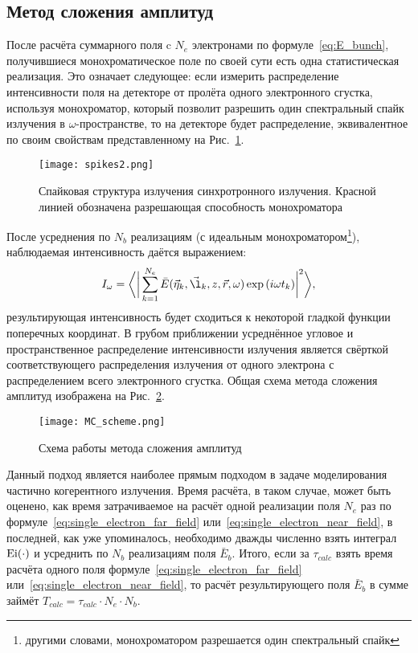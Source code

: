\subsection{Метод сложения амплитуд}
После расчёта суммарного поля c $N_e$ электронами по формуле~\ref{eq:E_bunch}, получившиеся монохроматическое поле по своей сути есть одна статистическая реализация. Это означает следующее: если измерить распределение интенсивности поля на детекторе от пролёта одного электронного сгустка, используя монохроматор, который позволит разрешить один спектральный спайк излучения в $\omega$-пространстве, то на детекторе будет распределение, эквивалентное по своим свойствам представленному на Рис.~\ref{fig:spikes2}. 
\begin{figure}[H]
	\centering 	\texttt{[image: spikes2.png]}
	\caption{Спайковая структура излучения синхротронного излучения. Красной линией обозначена разрешающая способность монохроматора}
	\label{fig:spikes2}
\end{figure}
\noindent После усреднения по $N_b$ реализациям (с идеальным монохроматором\footnote{другими словами, монохроматором разрешается один спектральный спайк}), наблюдаемая интенсивность даётся выражением: 
\begin{align}
	I_{\omega} = \bigg \langle \bigg|\sum\limits_{k=1}^{N_e} \bar{E}(\vec{\eta}_k, \vec{\l}_k, z, \vec{r}, \omega) \exp{(i \omega t_k)}\bigg|^2 \bigg \rangle,
	\label{eq:I_MC} 
\end{align}
\noindent результирующая интенсивность будет сходиться к некоторой гладкой функции поперечных координат. В грубом приближении усреднённое угловое и пространственное распределение интенсивности излучения является свёрткой соответствующего распределения излучения от одного электрона с распределением всего электронного сгустка. Общая схема метода сложения амплитуд изображена на Рис.~\ref{fig:MC_scheme}. 
\begin{figure}[H] 
	\centering 	\texttt{[image: MC\_scheme.png]}
	\caption{Схема работы метода сложения амплитуд}
	\label{fig:MC_scheme}
\end{figure}
Данный подход является наиболее прямым подходом в задаче моделирования частично когерентного излучения. Время расчёта, в таком случае, может быть оценено, как время затрачиваемое на расчёт одной реализации поля $N_e$ раз по формуле~\ref{eq:single_electron_far_field} или~\ref{eq:single_electron_near_field}, в последней, как уже упоминалось, необходимо дважды численно взять интеграл $\textup{Ei}(\cdot)$ и усреднить по $N_b$ реализациям поля $\bar{E}_{b}$. Итого, если за $\tau_{calc}$ взять время расчёта одного поля формуле~\ref{eq:single_electron_far_field} или~\ref{eq:single_electron_near_field}, то расчёт результирующего поля $\bar{E}_{b}$ в сумме займёт $T_{calc} = \tau_{calc} \cdot N_e \cdot N_b$.

